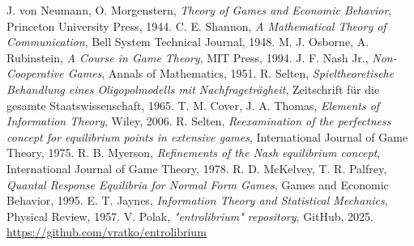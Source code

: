 \documentclass{article}
\begin{document}
\begin{thebibliography}{99} %
 J. von Neumann, O. Morgenstern, \emph{Theory of Games and Economic Behavior}, Princeton University Press, 1944.
 C. E. Shannon, \emph{A Mathematical Theory of Communication}, Bell System Technical Journal, 1948.
 M. J. Osborne, A. Rubinstein, \emph{A Course in Game Theory}, MIT Press, 1994.
 J. F. Nash Jr., \emph{Non-Cooperative Games}, Annals of Mathematics, 1951.
 R. Selten, \emph{Spieltheoretische Behandlung eines Oligopolmodells mit Nachfrageträgheit}, Zeitschrift für die gesamte Staatswissenschaft, 1965.
 T. M. Cover, J. A. Thomas, \emph{Elements of Information Theory}, Wiley, 2006. %
 R. Selten, \emph{Reexamination of the perfectness concept for equilibrium points in extensive games}, International Journal of Game Theory, 1975.
 R. B. Myerson, \emph{Refinements of the Nash equilibrium concept}, International Journal of Game Theory, 1978.
 R. D. McKelvey, T. R. Palfrey, \emph{Quantal Response Equilibria for Normal Form Games}, Games and Economic Behavior, 1995.
 E. T. Jaynes, \emph{Information Theory and Statistical Mechanics}, Physical Review, 1957.
 V. Polak, \emph{"entrolibrium" repository}, GitHub, 2025. \url{https://github.com/vratko/entrolibrium} %
\end{thebibliography}

\appendix
\end{document}
